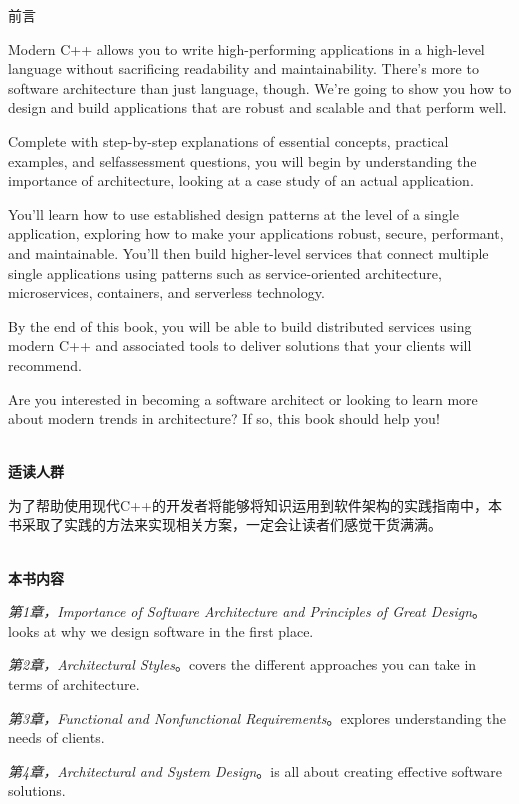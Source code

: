 \begin{flushright}
	 前言
\end{flushright}

Modern C++ allows you to write high-performing applications in a high-level language without sacrificing readability and maintainability. There's more to software architecture than just language, though. We're going to show you how to design and build applications that are robust and scalable and that perform well.

Complete with step-by-step explanations of essential concepts, practical examples, and selfassessment questions, you will begin by understanding the importance of architecture, looking at a case study of an actual application.

You'll learn how to use established design patterns at the level of a single application, exploring how to make your applications robust, secure, performant, and maintainable. You'll then build higher-level services that connect multiple single applications using patterns such as service-oriented architecture, microservices, containers, and serverless technology.

By the end of this book, you will be able to build distributed services using modern C++ and associated tools to deliver solutions that your clients will recommend.

Are you interested in becoming a software architect or looking to learn more about modern trends in architecture? If so, this book should help you!


\hspace*{\fill} \\ %
\noindent\textbf{适读人群}

为了帮助使用现代C++的开发者将能够将知识运用到软件架构的实践指南中，本书采取了实践的方法来实现相关方案，一定会让读者们感觉干货满满。

\hspace*{\fill} \\ %
\textbf{本书内容}

\textit{第1章，Importance of Software Architecture and Principles of Great Design}。looks at why we
design software in the first place.

\textit{第2章，Architectural Styles}。covers the different approaches you can take in terms of
architecture.

\textit{第3章，Functional and Nonfunctional Requirements}。explores understanding the needs of clients.

\textit{第4章，Architectural and System Design}。is all about creating effective software solutions.

